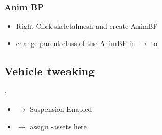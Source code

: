         \subsubsection{Anim BP}
            \begin{itemize}
                \item Right-Click skeletalmesh and create AnimBP
                \item change parent class of the AnimBP in  $\rightarrow$  to 
            \end{itemize}


    \subsection{Vehicle tweaking}
        \uline{}:
        \begin{itemize}
            \item {} $\rightarrow$ Suspension Enabled
            \item {} $\rightarrow$ assign -assets here
        \end{itemize}